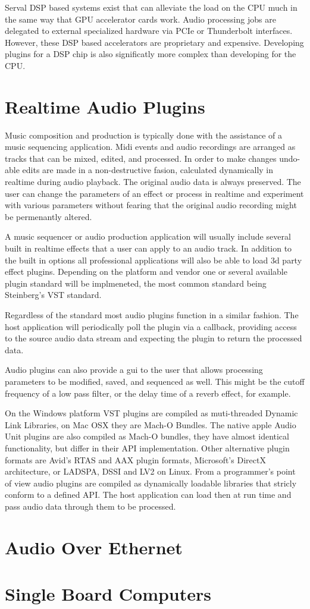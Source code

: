 Serval DSP based systems exist that can alleviate the load on the CPU much in the same way that GPU accelerator cards work. Audio processing jobs are delegated to external specialized hardware via PCIe or Thunderbolt interfaces. However, these DSP based accelerators are proprietary and expensive. Developing plugins for a DSP chip is also significatly more complex than developing for the CPU.

\section{Realtime Audio Plugins}

Music composition and production is typically done with the assistance of a music sequencing application. Midi events
 and audio recordings are arranged as tracks that can be mixed, edited, and processed. In order to make changes
 undo-able edits are made in a non-destructive fasion, calculated dynamically in realtime during audio playback. The
 original audio data is always preserved. The user can change the parameters of an effect or process in realtime and
 experiment with various parameters without fearing that the original audio recording might be permenantly altered.

A music sequencer or audio production application will usually include several built in realtime effects that a user
can apply to an audio track. In addition to the built in options all professional applications will also be able to
load 3d party effect plugins. Depending on the platform and vendor one or several available plugin standard will be
implmeneted, the most common standard being Steinberg's VST standard.

Regardless of the standard most audio plugins function in a similar fashion. The host application will periodically
poll the plugin via a callback, providing access to the source audio data stream and expecting the plugin to return the
 processed data.

 Audio plugins can also provide a gui to the user that allows processing parameters to be modified, saved, and
 sequenced as well. This might be the cutoff frequency of a low pass filter, or the delay time of a reverb effect,
 for example.

 On the Windows platform VST plugins are compiled as muti-threaded Dynamic Link Libraries, on Mac OSX they are Mach-O
 Bundles. The native apple Audio Unit plugins are also compiled as Mach-O bundles, they have almost identical
 functionality, but differ in their API implementation. Other alternative plugin formats are Avid's RTAS and AAX plugin formats, Microsoft's DirectX architecture, or LADSPA, DSSI and LV2 on Linux. From a programmer's point of view audio plugins are
 compiled as dynamically loadable libraries that stricly conform to a defined API. The host application can load
 then at run time and pass audio data through them to be processed.

\section{Audio Over Ethernet}

\section{Single Board Computers}